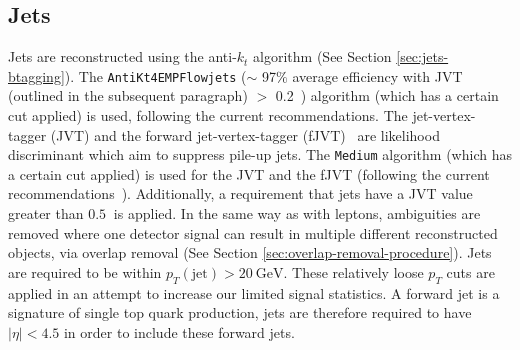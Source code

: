 \subsection{Jets}
Jets are reconstructed using the anti-$k_{t}$ algorithm (See Section \ref{sec:jets-btagging}). The \texttt{AntiKt4EMPFlowjets} ($\sim$ 97$\%$ average efficiency with JVT (outlined in the subsequent paragraph) $>$ 0.2~\cite{Tomiwa_2017}) algorithm (which has a certain cut applied) is used, following the current recommendations. The jet-vertex-tagger (JVT) and the forward jet-vertex-tagger (fJVT)~\cite{ATL-PHYS-PUB-2015-034} are likelihood discriminant which aim to suppress pile-up jets. The \texttt{Medium} algorithm (which has a certain cut applied) is used for the JVT and the fJVT (following the current recommendations~\cite{JVTandfJVT-Recommendations}). Additionally, a requirement that jets have a JVT value greater than $\SI{0.5}{}$ is applied. In the same way as with leptons, ambiguities are removed where one detector signal can result in multiple different reconstructed objects, via overlap removal (See Section \ref{sec:overlap-removal-procedure}). Jets are required to be within $p_{T}(\text{jet}) > \SI{20}{\GeV}$. These relatively loose $p_T$ cuts are applied in an attempt to increase our limited signal statistics. A forward jet is a signature of single top quark production, jets are therefore required to have $|\eta| < 4.5$ in order to include these forward jets.

